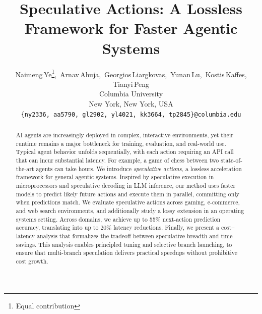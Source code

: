 \documentclass{article} %
\title{Speculative Actions: A Lossless Framework for Faster Agentic Systems}
\author{Naimeng\,Ye\thanks{Equal contribution},\, Arnav\,Ahuja\footnotemark[1],\, Georgios\,Liargkovas\footnotemark[1],\, Yunan\,Lu\footnotemark[1],\, Kostis\,Kaffes, Tianyi\,Peng \\
Columbia University\\
New York, New York, USA \\
\texttt{\{ny2336, aa5790, gl2902, yl4021, kk3664, tp2845\}@columbia.edu}
}
\theoremstyle{plain} %
\theoremstyle{definition} %
\theoremstyle{remark} %
\begin{document}
\maketitle

\begin{abstract}
AI agents are increasingly deployed in complex, interactive environments, yet their runtime remains a major bottleneck for training, evaluation, and real-world use.
Typical agent behavior unfolds sequentially, with each action requiring an API call that can incur substantial latency.
For example, a game of chess between two state-of-the-art agents can take hours.
We introduce \emph{speculative actions}, a lossless acceleration framework for general agentic systems. Inspired by speculative execution in microprocessors and speculative decoding in LLM inference, our method uses faster models to predict likely future actions and execute them in parallel, committing only when predictions match. %
%
We evaluate speculative actions across gaming, e-commerce, and web search environments, and additionally study a lossy extension in an operating systems setting. Across domains, we achieve up to 55\% next-action prediction accuracy, translating into up to 20\% latency reductions.
Finally, we present a cost–latency analysis that formalizes the tradeoff between speculative breadth and time savings. This analysis enables principled tuning and selective branch launching, to ensure that multi-branch speculation delivers practical speedups without prohibitive cost growth.


\end{abstract}
\end{document}
